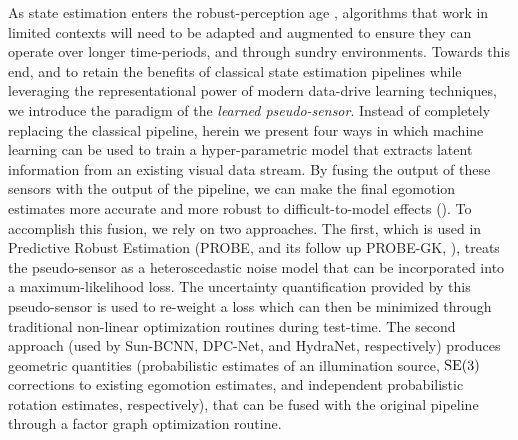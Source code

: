 As state estimation enters the robust-perception age \citep{Cadena2016-ds}, algorithms that work in limited contexts will need to be adapted and augmented to ensure they can operate over longer time-periods, and through sundry environments. Towards this end, and to retain the benefits of classical state estimation pipelines while leveraging the representational power of modern data-drive learning techniques, we introduce the paradigm of the \textit{learned pseudo-sensor}. Instead of completely replacing the classical pipeline, herein we present four ways in which machine learning can be used to train a hyper-parametric model that extracts latent information from an existing visual data stream. By fusing the output of these sensors with the output of the pipeline, we can make the final egomotion estimates more accurate and more robust to difficult-to-model effects (). To accomplish this fusion, we rely on two approaches. The first, which is used in Predictive Robust Estimation (PROBE, and its follow up PROBE-GK, ), treats the pseudo-sensor as a heteroscedastic noise model that can be incorporated into a maximum-likelihood loss. The uncertainty quantification provided by this pseudo-sensor is used to re-weight a loss which can then be minimized through traditional non-linear optimization routines during test-time. The second approach (used by Sun-BCNN, DPC-Net, and HydraNet,   respectively) produces geometric quantities (probabilistic estimates of an illumination source, $\mathrm{SE}(3)$ corrections to existing egomotion estimates, and independent probabilistic rotation estimates, respectively), that can be fused with the original pipeline through a factor graph optimization routine.


